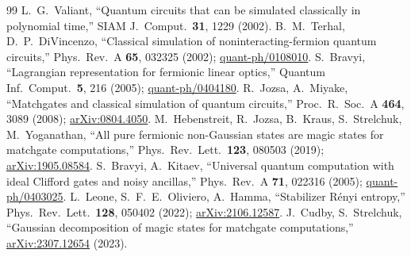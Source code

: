 \begin{thebibliography}{99}
 L.~G.~Valiant, ``Quantum circuits that can be simulated classically in polynomial time,'' SIAM J.\ Comput.\ \textbf{31}, 1229 (2002).
 B.~M.~Terhal, D.~P.~DiVincenzo, ``Classical simulation of noninteracting-fermion quantum circuits,'' Phys.\ Rev.\ A \textbf{65}, 032325 (2002); \href{https://arxiv.org/abs/quant-ph/0108010}{quant-ph/0108010}.
 S.~Bravyi, ``Lagrangian representation for fermionic linear optics,'' Quantum Inf.\ Comput.\ \textbf{5}, 216 (2005); \href{https://arxiv.org/abs/quant-ph/0404180}{quant-ph/0404180}.
 R.~Jozsa, A.~Miyake, ``Matchgates and classical simulation of quantum circuits,'' Proc.\ R.\ Soc.\ A \textbf{464}, 3089 (2008); \href{https://arxiv.org/abs/0804.4050}{arXiv:0804.4050}.
 M.~Hebenstreit, R.~Jozsa, B.~Kraus, S.~Strelchuk, M.~Yoganathan, ``All pure fermionic non-Gaussian states are magic states for matchgate computations,'' Phys.\ Rev.\ Lett.\ \textbf{123}, 080503 (2019); \href{https://arxiv.org/abs/1905.08584}{arXiv:1905.08584}.
 S.~Bravyi, A.~Kitaev, ``Universal quantum computation with ideal Clifford gates and noisy ancillas,'' Phys.\ Rev.\ A \textbf{71}, 022316 (2005); \href{https://arxiv.org/abs/quant-ph/0403025}{quant-ph/0403025}.
 L.~Leone, S.~F.~E.~Oliviero, A.~Hamma, ``Stabilizer R\'enyi entropy,'' Phys.\ Rev.\ Lett.\ \textbf{128}, 050402 (2022); \href{https://arxiv.org/abs/2106.12587}{arXiv:2106.12587}.
 J.~Cudby, S.~Strelchuk, ``Gaussian decomposition of magic states for matchgate computations,'' \href{https://arxiv.org/abs/2307.12654}{arXiv:2307.12654} (2023).

\end{thebibliography}
